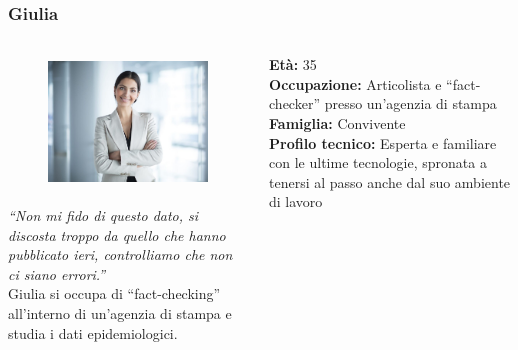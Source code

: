 \documentclass[handout]{beamer}
\begin{document}
		\begin{frame}
			\frametitle{Giulia}
			\begin{columns}[t]
				\begin{column}[T]{5cm}
					\begin{figure}
						\centering
						\vspace{-10pt}
						\includegraphics[height=3.5cm]{img/giulia}
					\end{figure}
					\vspace{-10pt}

					\textit{``Non mi fido di questo dato, si discosta troppo da quello che hanno pubblicato ieri, controlliamo che non ci siano errori.''}\\
					Giulia si occupa di ``fact-checking'' all'interno di un'agenzia di stampa e studia i dati epidemiologici.
				\end{column}
				\begin{column}[T]{5cm}
					\textbf{Età:} 35\\
					\textbf{Occupazione:} Articolista e ``fact-checker'' presso un'agenzia di stampa\\
					\textbf{Famiglia:} Convivente\\
					\textbf{Profilo tecnico:} Esperta e familiare con le ultime tecnologie, spronata a tenersi al passo anche dal suo ambiente di lavoro\\
				\end{column}
			\end{columns}
		\end{frame}
\end{document}
